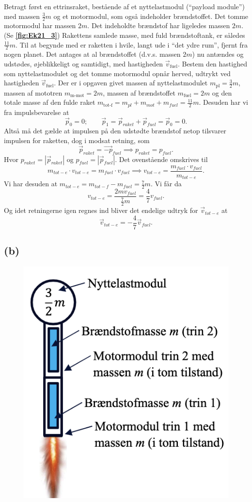 \documentclass[12pt]{article}
\theoremstyle{definition}
\begin{document}
Betragt først en ettrinsraket, bestående af et nyttelastmodul (“payload module”) med massen $\frac{3}{2}m$ og et motormodul, som også indeholder brændstoffet. Det tomme motormodul har massen $2m$. Det indeholdte brændstof har ligeledes massen $2m$. (Se \textbf{\autoref{fig:Ek21_3}}) Rakettens samlede masse, med fuld brændstoftank, er således $\frac{11}{2}m$. Til at begynde med er raketten i hvile, langt ude i “det ydre rum”, fjernt fra nogen planet. Det antages at al brændstoffet (d.v.s. massen $2m$) nu antændes og udstødes, øjeblikkeligt og samtidigt, med hastigheden $\Vec{v}_{\text{fuel}}$. Bestem den hastighed som nyttelastmodulet og det tomme motormodul opnår herved, udtrykt ved hastigheden $\Vec{v}_{\text{fuel}}$.
\bigbreak
Der er i opgaven givet massen af nyttelastmodulet $m_{\text{pl}} = \frac{3}{2}m$, massen af mototren $m_{\text{m-mot}} = 2m$, massen af brændstoffet $m_{\text{fuel}} = 2m$ og den totale masse af den fulde raket $m_{\text{tot-f}} = m_{pl} + m_{mot} + m_{fuel} = \frac{11}{2}m$. Desuden har vi fra impulsbevarelse at
\[ 
\Vec{p}_0 = 0; \qquad \Vec{p}_1 = \Vec{p}_{raket} + \Vec{p}_{fuel} = \Vec{p}_0 = 0
.\]
Altså må det gælde at impulsen på den udstødte brændstof netop tilsvarer impulsen for raketten, dog i modsat retning, som
\[ 
\Vec{p}_{raket} = \Vec{-p}_{fuel} \implies p_{raket} = p_{fuel}
.\]
Hvor $p_{raket} = |\Vec{p}_{raket}|$ og $p_{fuel} = |\Vec{p}_{fuel}|$. Det ovenstående omskrives til
\[ 
  m_{tot-e} \cdot v_{tot-e} = m_{fuel} \cdot v_{fuel} \implies v_{tot-e} = \frac{m_{fuel} \cdot v_{fuel}}{m_{tot-e}}
.\]
Vi har desuden at $m_{tot-e} = m_{tot-f} - m_{fuel} = \frac{7}{2}m$. Vi får da
\[ 
v_{tot-e} = \frac{2m v_{fuel}}{\frac{7}{2}m} = \frac{4}{7} v_{fuel}
.\]
Og idet retningerne igen regnes ind bliver det endelige udtryk for $\Vec{v}_{tot-e}$ at
\[ 
\Vec{v}_{tot-e} = -\frac{4}{7} \Vec{v}_{fuel}
.\]



\subsection*{(b)}
\begin{figure} [ht]
  \centering
  \caption{}
  \includegraphics[width=0.15\linewidth]{../figures/Ek21_4.png}
  \label{fig:Ek21_4}
\end{figure}
\end{document}
